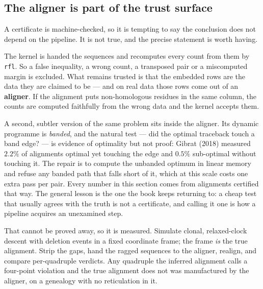 \subsection{The aligner is part of the trust surface}\label{sub:aligner}

A certificate is machine-checked, so it is tempting to say the conclusion does
not depend on the pipeline. It is not true, and the precise statement is worth
having.

The kernel is handed the sequences and recomputes every count from them by
\texttt{rfl}. So a false inequality, a wrong count, a transposed pair or a
miscomputed margin is excluded. What remains trusted is that the embedded rows
are the data they are claimed to be --- and on real data those rows come out of
an \textbf{aligner}. If the alignment puts non-homologous residues in the same
column, the counts are computed faithfully from the wrong data and the kernel
accepts them.

A second, subtler version of the same problem sits inside the aligner. Its
dynamic programme is \emph{banded}, and the natural test --- did the optimal
traceback touch a band edge? --- is evidence of optimality but not proof: Gibrat
(2018) measured $2.2\%$ of alignments optimal yet touching the edge and $0.5\%$
sub-optimal without touching it. The repair is to compute the unbanded optimum
in linear memory and refuse any banded path that falls short of it, which at this
scale costs one extra pass per pair. Every number in this section comes from
alignments certified that way. The general lesson is the one the book keeps
returning to: a cheap test that usually agrees with the truth is not a
certificate, and calling it one is how a pipeline acquires an unexamined step.

That cannot be proved away, so it is measured. Simulate clonal, relaxed-clock
descent with deletion events in a fixed coordinate frame; the frame \emph{is}
the true alignment. Strip the gaps, hand the ragged sequences to the aligner,
realign, and compare per-quadruple verdicts. Any quadruple the inferred
alignment calls a four-point violation and the true alignment does not was
manufactured by the aligner, on a genealogy with no reticulation in it.

